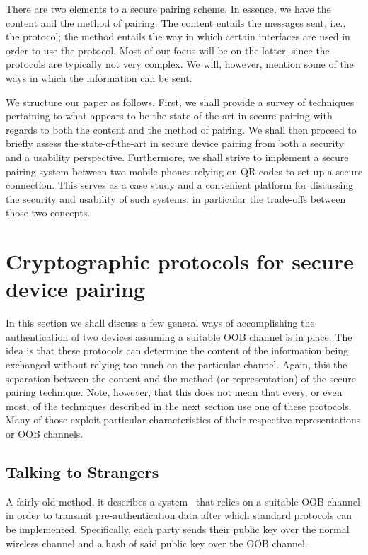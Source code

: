 \documentclass[conference, 11pt]{sty/IEEEtran}
\begin{document}
There are two elements to a secure pairing scheme.
In essence, we have the content and the method of pairing.
The content entails the messages sent, i.e., the protocol; the method entails the way in which certain interfaces are used in order to use the protocol.
Most of our focus will be on the latter, since the protocols are typically not very complex.
We will, however, mention some of the ways in which the information can be sent.

We structure our paper as follows.
First, we shall provide a survey of techniques pertaining to what appears to be the state-of-the-art in secure pairing with regards to both the content and the method of pairing.
We shall then proceed to briefly assess the state-of-the-art in secure device pairing from both a security and a usability perspective.
Furthermore, we shall strive to implement a secure pairing system between two mobile phones relying on QR-codes to set up a secure connection.
This serves as a case study and a convenient platform for discussing the security and usability of such systems, in particular the trade-offs between those two concepts.

\section{Cryptographic protocols for secure device pairing}
\label{sec:cryptographic_protocols_for_secure_device_pairing}

In this section we shall discuss a few general ways of accomplishing the authentication of two devices assuming a suitable OOB channel is in place.
The idea is that these protocols can determine the content of the information being exchanged without relying too much on the particular channel.
Again, this the separation between the content and the method (or representation) of the secure pairing technique.
Note, however, that this does not mean that every, or even most, of the techniques described in the next section use one of these protocols.
Many of those exploit particular characteristics of their respective representations or OOB channels.

\subsection{Talking to Strangers}
\label{ssec:talking_to_strangers}

A fairly old method, it describes a system~\cite{balfanz2002talking} that relies on a suitable OOB channel in order to transmit pre-authentication data after which standard protocols can be implemented.
Specifically, each party sends their public key over the normal wireless channel and a hash of said public key over the OOB channel.
\end{document}
